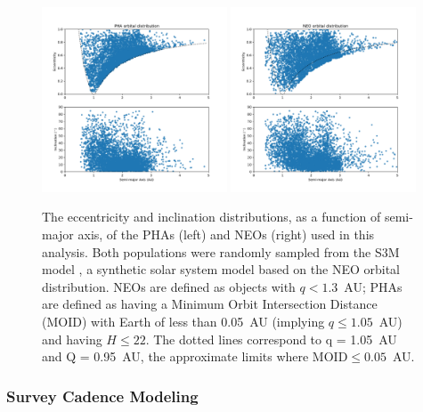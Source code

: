 \begin{figure}[t!]
\centering
\includegraphics[width=0.49\textwidth]{figures/pha_5k_orbits}
\includegraphics[width=0.49\textwidth]{figures/neo_5k_orbits}
\vskip -0.2in
\caption{The eccentricity and inclination distributions, as a function of semi-major axis, of the PHAs (left) and NEOs (right) used in this analysis. Both populations were randomly sampled from the S3M model \citep{Grav2011}, a synthetic solar system model based on the \cite{Bottke2002} NEO orbital distribution. NEOs are defined as objects with $q<1.3$~AU; PHAs are defined as having a Minimum Orbit Intersection Distance (MOID) with Earth of less than 0.05~AU (implying $q\le1.05$~AU) and having $H\le22$.  The dotted lines correspond to q = 1.05~AU and Q = 0.95~AU, the approximate limits where MOID$\le 0.05$~AU. \label{fig:PHA_orbits}}
\end{figure}

\subsubsection{Survey Cadence Modeling}

